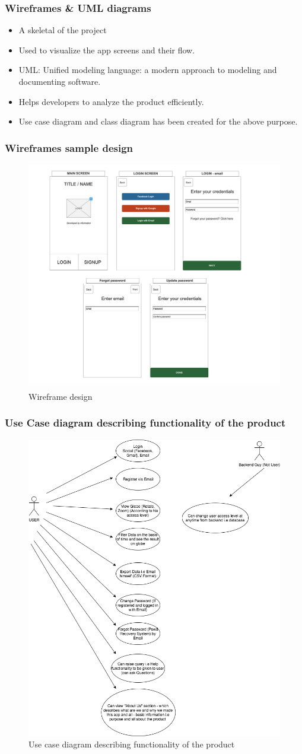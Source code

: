 \begin{frame}
\frametitle{Wireframes \& UML diagrams}
\begin{itemize}
    \item A skeletal of the project
    \item Used to visualize the app screens and their flow.
    \item UML: Unified modeling language: a modern approach to modeling and documenting software.
    \item Helps developers to analyze the product efficiently.
    \item Use case diagram and class diagram has been created for the above purpose.
\end{itemize}

\end{frame}

\begin{frame}
\frametitle{Wireframes sample design}
 \begin{figure}[H]
            \centering
            \includegraphics[width=0.60\linewidth]{figures/wireframe_2.png}
            \caption{Wireframe design}
    \end{figure}
\end{frame}

\begin{frame}
\frametitle{Use Case diagram describing functionality of the product}
 \begin{figure}[H]
            \centering
            \includegraphics[width=0.50\linewidth]{final/figures/usecase.png}
            \caption{Use case diagram describing functionality of the product}
    \end{figure}
\end{frame}



